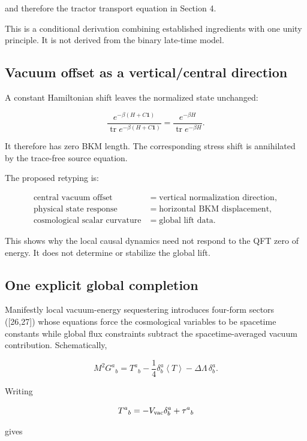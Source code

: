 \documentclass[
  11pt,
  letterpaper,
]{article}
\begin{document}
and therefore the tractor transport equation in Section 4.

This is a conditional derivation combining established ingredients with
one unity principle. It is not derived from the binary late-time model.

\subsection{Vacuum offset as a vertical/central
direction}\label{vacuum-offset-as-a-verticalcentral-direction}

A constant Hamiltonian shift leaves the normalized state unchanged:

\[
\frac{e^{-\beta(H+C\mathbf1)}}{\operatorname{tr}e^{-\beta(H+C\mathbf1)}}
=\frac{e^{-\beta H}}{\operatorname{tr}e^{-\beta H}}.
\]

It therefore has zero BKM length. The corresponding stress shift is
annihilated by the trace-free source equation.

The proposed retyping is:

\[
\boxed{
\begin{aligned}
\text{central vacuum offset}
&=\text{vertical normalization direction},\\
\text{physical state response}
&=\text{horizontal BKM displacement},\\
\text{cosmological scalar curvature}
&=\text{global lift data}.
\end{aligned}}
\]

This shows why the local causal dynamics need not respond to the QFT
zero of energy. It does not determine or stabilize the global lift.

\subsection{One explicit global
completion}\label{one-explicit-global-completion}

Manifestly local vacuum-energy sequestering introduces four-form sectors
({[}26,27{]}) whose equations force the cosmological variables to be
spacetime constants while global flux constraints subtract the
spacetime-averaged vacuum contribution. Schematically,

\[
M^2G^a{}_b
=T^a{}_b-\frac14\delta^a_b\left\langle T\right\rangle-\Delta\Lambda\,\delta^a_b.
\]

Writing

\[
T^a{}_b=-V_{\rm vac}\delta^a_b+\tau^a{}_b
\]

gives
\end{document}
